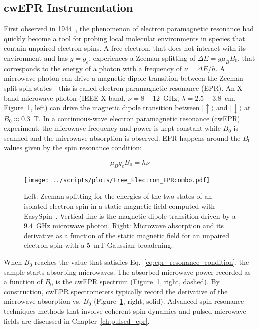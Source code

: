 \subsection{cwEPR Instrumentation}
\label{subs:cwEPR_spectroscopy}
First observed in 1944~\cite{Zavoisky_1945_JP,zavoisky_1945,salikhov_2015}, the phenomenon of electron paramagnetic resonance had quickly become a tool for probing local molecular environments in species that contain unpaired electron spins. A free electron, that does not interact with its environment and has $g=g_e$, experiences a Zeeman splitting of $\Delta E = g \mu_B B_0$, that corresponds to the energy of a photon with a frequency of $\nu=\Delta E / h$. A microwave photon can drive a magnetic dipole transition between the Zeeman-split spin states - this is called electron paramagnetic resonance (EPR). An X band microwave photon (IEEE X band, $\nu=8-12$~GHz, $\lambda=2.5-3.8$~cm, Figure~\ref{fig:cwerp_free_electron}, left) can drive the magnetic dipole transition between $\vert{\uparrow\rangle}$ and $\vert{\downarrow\rangle}$ at $B_0\approx0.3$~T. In a continuous-wave electron paramagnetic resonance (cwEPR) experiment, the microwave frequency and power is kept constant while $B_0$ is scanned and the microwave absorption is observed. EPR happens around the $B_0$ values given by the spin resonance condition:

\begin{equation}
\label{eq:epr_resonance_condition}
\mu_B g_e B_0 = h\nu
\end{equation}

\begin{figure}[h]
\center
	\texttt{[image: ../scripts/plots/Free\_Electron\_EPRcombo.pdf]}
	\caption{Left: Zeeman splitting for the energies of the two states of an isolated electron spin in a static magnetic field computed with EasySpin~\cite{Stoll2006}. Vertical line is the magnetic dipole transition driven by a $9.4$~GHz microwave photon. Right: Microwave absorption and its derivative as a function of the static magnetic field for an unpaired electron spin with a 5~mT Gaussian broadening.}
	\label{fig:cwerp_free_electron}
\end{figure}


\par
When $B_0$ reaches the value that satisfies Eq.~\ref{eq:epr_resonance_condition}, the sample starts absorbing microwaves. The absorbed microwave power recorded as a function of $B_0$ is the cwEPR spectrum (Figure~\ref{fig:cwerp_free_electron}, right, dashed). By construction, cwEPR spectrometers typically record the derivative of the microwave absorption vs. $B_0$ (Figure~\ref{fig:cwerp_free_electron}, right, solid). Advanced spin resonance techniques methods that involve coherent spin dynamics and pulsed microwave fields are discussed in Chapter~\ref{ch:pulsed_epr}.

